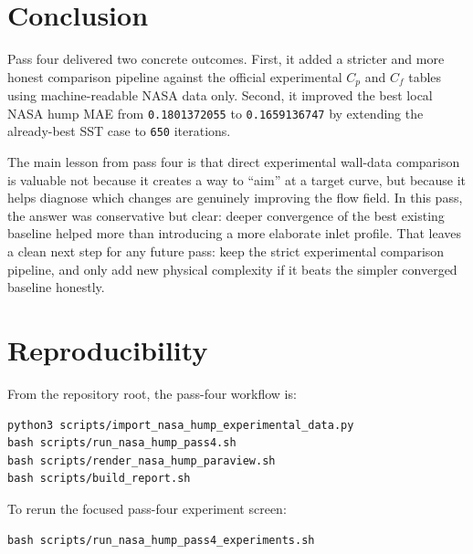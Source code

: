 \documentclass[11pt]{article}
\begin{document}
\section{Conclusion}
Pass four delivered two concrete outcomes. First, it added a stricter and more honest comparison pipeline against the official experimental \(C_p\) and \(C_f\) tables using machine-readable NASA data only. Second, it improved the best local NASA hump MAE from \texttt{0.1801372055} to \texttt{0.1659136747} by extending the already-best SST case to \texttt{650} iterations.

The main lesson from pass four is that direct experimental wall-data comparison is valuable not because it creates a way to ``aim'' at a target curve, but because it helps diagnose which changes are genuinely improving the flow field. In this pass, the answer was conservative but clear: deeper convergence of the best existing baseline helped more than introducing a more elaborate inlet profile. That leaves a clean next step for any future pass: keep the strict experimental comparison pipeline, and only add new physical complexity if it beats the simpler converged baseline honestly.

\section{Reproducibility}
From the repository root, the pass-four workflow is:
\begin{lstlisting}
python3 scripts/import_nasa_hump_experimental_data.py
bash scripts/run_nasa_hump_pass4.sh
bash scripts/render_nasa_hump_paraview.sh
bash scripts/build_report.sh
\end{lstlisting}

To rerun the focused pass-four experiment screen:
\begin{lstlisting}
bash scripts/run_nasa_hump_pass4_experiments.sh
\end{lstlisting}



\end{document}
